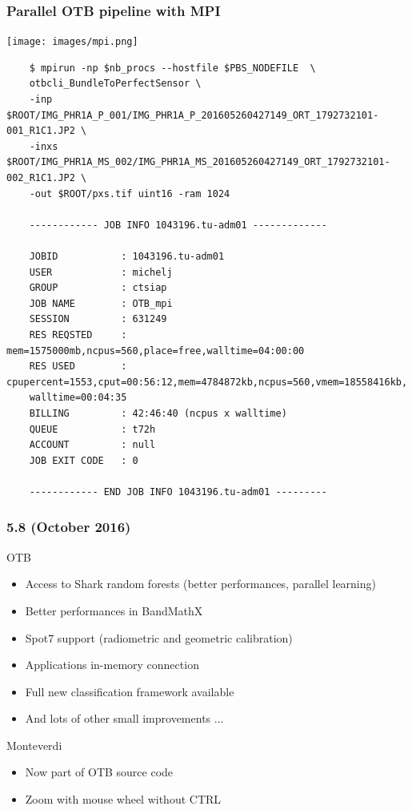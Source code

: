 \documentclass[8pt]{beamer}
\begin{document}
\begin{frame}[fragile]
\frametitle{Parallel OTB pipeline with MPI}
  \begin{center}
  \vspace{-0.5cm}
  \texttt{[image: images/mpi.png]}
  \begin{scriptsize}
\begin{verbatim}
    $ mpirun -np $nb_procs --hostfile $PBS_NODEFILE  \
    otbcli_BundleToPerfectSensor \
    -inp $ROOT/IMG_PHR1A_P_001/IMG_PHR1A_P_201605260427149_ORT_1792732101-001_R1C1.JP2 \
    -inxs $ROOT/IMG_PHR1A_MS_002/IMG_PHR1A_MS_201605260427149_ORT_1792732101-002_R1C1.JP2 \
    -out $ROOT/pxs.tif uint16 -ram 1024

    ------------ JOB INFO 1043196.tu-adm01 -------------
    
    JOBID           : 1043196.tu-adm01
    USER            : michelj
    GROUP           : ctsiap
    JOB NAME        : OTB_mpi
    SESSION         : 631249
    RES REQSTED     : mem=1575000mb,ncpus=560,place=free,walltime=04:00:00
    RES USED        : cpupercent=1553,cput=00:56:12,mem=4784872kb,ncpus=560,vmem=18558416kb,
    walltime=00:04:35
    BILLING         : 42:46:40 (ncpus x walltime)
    QUEUE           : t72h
    ACCOUNT         : null
    JOB EXIT CODE   : 0
    
    ------------ END JOB INFO 1043196.tu-adm01 ---------
\end{verbatim}
\end{scriptsize}
\end{center}
\end{frame}

\begin{frame}
\frametitle{5.8 (October 2016)}
\begin{block}{OTB}
\begin{itemize}
\item Access to Shark random forests (better performances, parallel learning)
\item Better performances in BandMathX
\item Spot7 support (radiometric and geometric calibration)
\item Applications in-memory connection
\item Full new classification framework available
\item And lots of other small improvements ...
\end{itemize}
\end{block}

\begin{block}{Monteverdi}
\begin{itemize}
\item Now part of OTB source code
\item Zoom with mouse wheel without CTRL
\end{itemize}
\end{block}
\end{frame}
\end{document}
